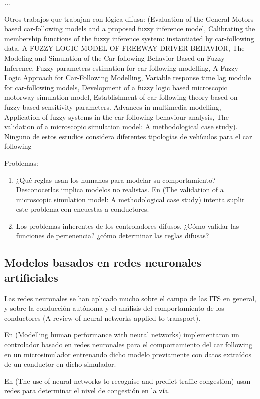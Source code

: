 ...

Otros trabajos que trabajan con lógica difusa: (Evaluation of the General Motors based car-following models and a proposed fuzzy inference model, Calibrating the membership functions of the fuzzy inference system: instantiated by car-following data, A FUZZY LOGIC MODEL OF FREEWAY DRIVER BEHAVIOR, The Modeling and Simulation of the Car-following Behavior Based on Fuzzy Inference, Fuzzy parameters estimation for car-following modelling, A Fuzzy Logic Approach for Car-Following Modelling, Variable response time lag module for car-following models, Development of a fuzzy logic based microscopic motorway simulation model, Establishment of car following theory based on fuzzy-based sensitivity parameters. Advances in multimedia modelling, Application of fuzzy systems in the car-following behaviour analysis, The validation of a microscopic simulation model: A methodological case study). Ninguno de estos estudios considera diferentes tipologías de vehículos para el car following

Problemas:

\begin{enumerate}
	\item ¿Qué reglas usan los humanos para modelar su comportamiento? Desconocerlas implica modelos no realistas. En (The validation of a microscopic simulation model: A methodological case study) intenta suplir este problema con encuestas a conductores.
	\item Los problemas inherentes de los controladores difusos. ¿Cómo validar las funciones de pertenencia? ¿cómo determinar las reglas difusas?
\end{enumerate}

\subsection{Modelos basados en redes neuronales artificiales}

Las redes neuronales se han aplicado mucho sobre el campo de las ITS en general, y sobre la conducción autónoma y el análisis del comportamiento de los conductores (A review of neural networks applied to transport).

En (Modelling human performance with neural networks) implementaron un controlador basado en redes neuronales para el comportamiento del car following en un microsimulador entrenando dicho modelo previamente con datos extraídos de un conductor en dicho simulador.

En (The  use  of  neural  networks  to  recognise  and
predict traffic congestion) usan redes para determinar el nivel de congestión en la vía.

